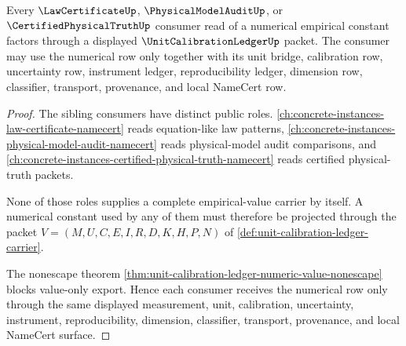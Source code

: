 \begin{theorem}
\label{thm:unit-calibration-ledger-law-certificate-handoff}
Every $\LawCertificateUp$, $\PhysicalModelAuditUp$, or $\CertifiedPhysicalTruthUp$ consumer read of a numerical empirical constant factors through a displayed $\UnitCalibrationLedgerUp$ packet. The consumer may use the numerical row only together with its unit bridge, calibration row, uncertainty row, instrument ledger, reproducibility ledger, dimension row, classifier, transport, provenance, and local NameCert row.
\end{theorem}
\begin{proof}
The sibling consumers have distinct public roles. \autoref{ch:concrete-instances-law-certificate-namecert} reads equation-like law patterns, \autoref{ch:concrete-instances-physical-model-audit-namecert} reads physical-model audit comparisons, and \autoref{ch:concrete-instances-certified-physical-truth-namecert} reads certified physical-truth packets.

None of those roles supplies a complete empirical-value carrier by itself. A numerical constant used by any of them must therefore be projected through the packet $V=(M,U,C,E,I,R,D,K,H,P,N)$ of \autoref{def:unit-calibration-ledger-carrier}.

The nonescape theorem \autoref{thm:unit-calibration-ledger-numeric-value-nonescape} blocks value-only export. Hence each consumer receives the numerical row only through the same displayed measurement, unit, calibration, uncertainty, instrument, reproducibility, dimension, classifier, transport, provenance, and local NameCert surface.
\end{proof}

